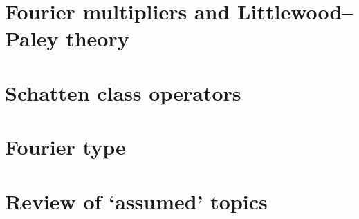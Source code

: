 \documentclass[a4paper,10pt]{amsbook}
\begin{document}
\chapter{Fourier multipliers and Littlewood--Paley theory}
\label{sec:HT}


\chapter{Schatten class operators}
\label{sec:schatten}


\chapter{Fourier type}
\label{sec:fouriertype}



\appendix
\chapter{Review of `assumed' topics}
\label{sec:appendices}








 
\end{document}
